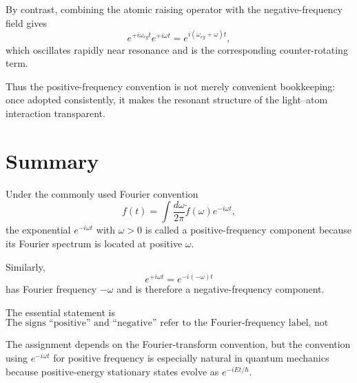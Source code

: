 \documentclass[11pt]{article}
\begin{document}
By contrast, combining the atomic raising operator with the negative-frequency field gives
\begin{equation}
e^{+i\omega_{eg}t}
e^{+i\omega t}
=
e^{i(\omega_{eg}+\omega)t},
\label{eq:counterrotating-factor}
\end{equation}
which oscillates rapidly near resonance and is the corresponding counter-rotating term.

Thus the positive-frequency convention is not merely convenient bookkeeping: once adopted consistently, it makes the resonant structure of the light--atom interaction transparent.

\section{Summary}

Under the commonly used Fourier convention
\begin{equation}
f(t)
=
\int\frac{d\omega}{2\pi}
\widetilde f(\omega)e^{-i\omega t},
\end{equation}
the exponential $e^{-i\omega t}$ with $\omega>0$ is called a positive-frequency component because its Fourier spectrum is located at positive $\omega$.

Similarly,
\begin{equation}
e^{+i\omega t}
=
e^{-i(-\omega)t}
\end{equation}
has Fourier frequency $-\omega$ and is therefore a negative-frequency component.

The essential statement is
\begin{equation}
\boxed{
\text{The signs ``positive'' and ``negative'' refer to the Fourier-frequency label,
not directly to the sign in the exponent.}
}
\label{eq:main-summary}
\end{equation}

The assignment depends on the Fourier-transform convention, but the convention using $e^{-i\omega t}$ for positive frequency is especially natural in quantum mechanics because positive-energy stationary states evolve as $e^{-iEt/\hbar}$.
\end{document}
